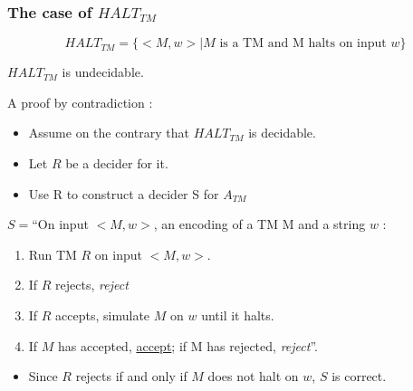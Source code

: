 \documentclass[12pt,a4paper]{article}
\newcommand{\halt}{\ensuremath{HALT_{TM}} }
\newcommand{\<}{\langle}
\renewcommand{\>}{\rangle}
\begin{document}
\subsubsection{The case of \halt}
\[HALT_{TM} = \{<M,w> | M\text{ is a TM and M halts on input }w\}\]
\begin{boite}[0.6]
    \centering
     $HALT_{TM}$ is undecidable.
\end{boite}
A proof by contradiction :
\begin{itemize}
    \item Assume on the contrary that \halt is decidable.
    \item Let $R$ be a decider for it.
    \item Use R to construct a decider S for $A_{TM}$
\end{itemize}
$S = $``On input $<M,w>$, an encoding of a TM M and a string $w$ :
\begin{enumerate}
    \item Run TM $R$ on input $<M,w>$.
    \item If $R$ rejects, \textit{reject}
    \item If $R$ accepts, simulate $M$ on $w$ until it halts.
    \item If $M$ has accepted, \uline{accept}; if M has rejected, \textit{reject}''.
\end{enumerate}
\begin{itemize}
    \item Since $R$ rejects if and only if $M$ does not halt on $w$, $S$ is correct.
\end{itemize}
\end{document}
